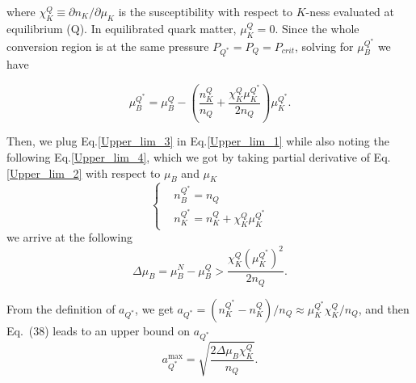 \documentclass[superscriptaddress,amsmath,floatfix,aps,prc,twocolumn]{revtex4-1}
\newcommand{\com}[1]{{\sf\color[rgb]{0,0,1}[#1]}}
\newcommand{\JS}[1]{\textsf{\color{violet} {[\textsuperscript{JS}#1]}}}
\begin{document}
where $\chi_K^Q \equiv \partial n_K / \partial \mu_K$ is the susceptibility with respect to $K$-ness evaluated at equilibrium (Q). In equilibrated quark matter, $\mu_K^Q = 0$. Since the whole conversion region is at the same pressure $P_{Q^*} = P_Q = P_{crit}$, solving for $\mu_B^{Q^*}$ we have 

\begin{equation}
\mu_B^{Q^*} = \mu_B^Q - \left( \frac{n_K^Q}{n_Q} + \frac{\chi_K^Q \mu_K^{Q^*}}{2 n_Q} \right) \mu_K^{Q^*}.\label{Upper_lim_3}
\end{equation}

Then, we plug Eq.\eqref{Upper_lim_3} in Eq.\eqref{Upper_lim_1} while also noting the following Eq.\eqref{Upper_lim_4}, which we got by taking partial derivative of Eq.\eqref{Upper_lim_2} with respect to $\mu_B$ and $\mu_K$
\begin{equation}
\left\{
\begin{aligned}
& n_B^{Q^*} = n_Q \\
& n_K^{Q^*} = n_K^Q + \chi_K^Q\mu_K^{Q^*}
\end{aligned}
\right.
\label{Upper_lim_4}
\end{equation}
we arrive at the following
\begin{equation}
\Delta \mu_B = \mu_B^N - \mu_B^Q > \frac{\chi_K^Q (\mu_K^{Q^*})^2}{2 n_Q}.
\end{equation}

From the definition of $a_{Q^*}$, we get $a_{Q^*} = (n_K^{Q^*} - n_K^Q) / n_Q \approx \mu_K^{Q^*} \chi_K^Q / n_Q$, and then Eq.~(38) leads to an upper bound on $a_{Q^*}$
\begin{equation}
a_{Q^*}^{\mathrm{max}} = \sqrt{ \frac{2 \Delta \mu_B \chi_K^Q}{n_Q} }.
\end{equation}
\end{document}
